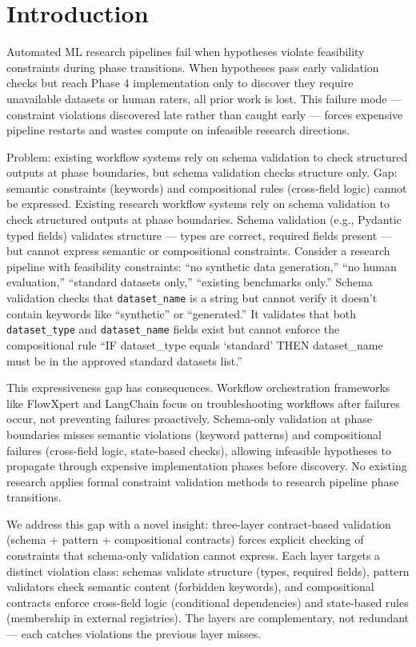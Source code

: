 \section{Introduction}

Automated ML research pipelines fail when hypotheses violate feasibility constraints during phase transitions. When hypotheses pass early validation checks but reach Phase 4 implementation only to discover they require unavailable datasets or human raters, all prior work is lost. This failure mode --- constraint violations discovered late rather than caught early --- forces expensive pipeline restarts and wastes compute on infeasible research directions.

Problem: existing workflow systems rely on schema validation to check structured outputs at phase boundaries, but schema validation checks structure only. Gap: semantic constraints (keywords) and compositional rules (cross-field logic) cannot be expressed. Existing research workflow systems rely on schema validation to check structured outputs at phase boundaries. Schema validation (e.g., Pydantic typed fields) validates structure --- types are correct, required fields present --- but cannot express semantic or compositional constraints. Consider a research pipeline with feasibility constraints: ``no synthetic data generation,'' ``no human evaluation,'' ``standard datasets only,'' ``existing benchmarks only.'' Schema validation checks that \texttt{dataset\_name} is a string but cannot verify it doesn't contain keywords like ``synthetic'' or ``generated.'' It validates that both \texttt{dataset\_type} and \texttt{dataset\_name} fields exist but cannot enforce the compositional rule ``IF dataset\_type equals `standard' THEN dataset\_name must be in the approved standard datasets list.''

This expressiveness gap has consequences. Workflow orchestration frameworks like FlowXpert and LangChain focus on troubleshooting workflows after failures occur, not preventing failures proactively. Schema-only validation at phase boundaries misses semantic violations (keyword patterns) and compositional failures (cross-field logic, state-based checks), allowing infeasible hypotheses to propagate through expensive implementation phases before discovery. No existing research applies formal constraint validation methods to research pipeline phase transitions.

We address this gap with a novel insight: three-layer contract-based validation (schema + pattern + compositional contracts) forces explicit checking of constraints that schema-only validation cannot express. Each layer targets a distinct violation class: schemas validate structure (types, required fields), pattern validators check semantic content (forbidden keywords), and compositional contracts enforce cross-field logic (conditional dependencies) and state-based rules (membership in external registries). The layers are complementary, not redundant --- each catches violations the previous layer misses.

